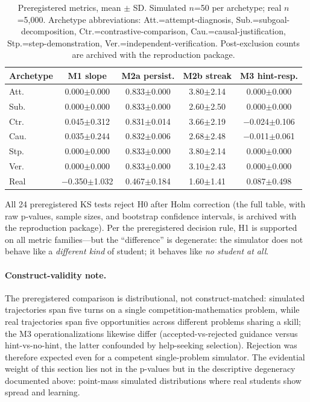 \documentclass[12pt,a4paper]{article}
\begin{document}
\begin{table}[t]
\centering
\caption{Preregistered metrics, mean $\pm$ SD. Simulated
$n$=50 per archetype; real $n$=5{,}000. Archetype abbreviations:
Att.=attempt-diagnosis, Sub.=subgoal-decomposition, Ctr.=contrastive-comparison,
Cau.=causal-justification, Stp.=step-demonstration, Ver.=independent-verification.
Post-exclusion counts are archived with the reproduction package.}
\label{tab:metrics}
\begin{tabular}{lcccc}
\toprule
Archetype & M1 slope & M2a persist. & M2b streak & M3 hint-resp. \\
\midrule
Att. & 0.000$\pm$0.000 & 0.833$\pm$0.000 & 3.80$\pm$2.14 & 0.000$\pm$0.000 \\
Sub. & 0.000$\pm$0.000 & 0.833$\pm$0.000 & 2.60$\pm$2.50 & 0.000$\pm$0.000 \\
Ctr. & 0.045$\pm$0.312 & 0.831$\pm$0.014 & 3.66$\pm$2.19 & $-$0.024$\pm$0.106 \\
Cau. & 0.035$\pm$0.244 & 0.832$\pm$0.006 & 2.68$\pm$2.48 & $-$0.011$\pm$0.061 \\
Stp. & 0.000$\pm$0.000 & 0.833$\pm$0.000 & 3.80$\pm$2.14 & 0.000$\pm$0.000 \\
Ver. & 0.000$\pm$0.000 & 0.833$\pm$0.000 & 3.10$\pm$2.43 & 0.000$\pm$0.000 \\
Real & $-$0.350$\pm$1.032 & 0.467$\pm$0.184 & 1.60$\pm$1.41 & 0.087$\pm$0.498 \\
\bottomrule
\end{tabular}
\end{table}

All 24 preregistered KS tests reject H0 after Holm correction (the full
table, with raw p-values, sample sizes, and bootstrap confidence intervals,
is archived with the reproduction package). Per the preregistered decision
rule, H1 is supported on all metric families---but the ``difference'' is
degenerate: the simulator does not behave like a \emph{different kind} of
student; it behaves like \emph{no student at all}.

\paragraph{Construct-validity note.} The preregistered comparison is
distributional, not construct-matched: simulated trajectories span five
turns on a single competition-mathematics problem, while real trajectories
span five opportunities across different problems sharing a skill; the M3
operationalizations likewise differ (accepted-vs-rejected guidance versus
hint-vs-no-hint, the latter confounded by help-seeking selection).
Rejection was therefore expected even for a competent single-problem
simulator. The evidential weight of this section lies not in the p-values
but in the descriptive degeneracy documented above: point-mass simulated
distributions where real students show spread and learning.
\end{document}
